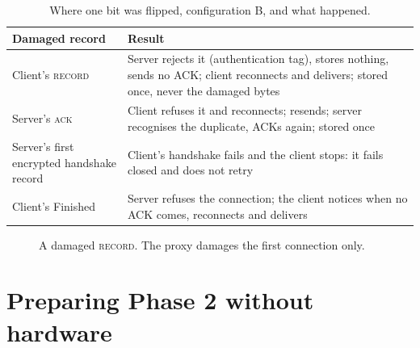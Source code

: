 \documentclass[11pt,a4paper]{article}
\newcommand{\msg}[1]{\textsc{#1}}
\begin{document}
\begin{table}[!htbp]
\centering
\caption{Where one bit was flipped, configuration B, and what happened.}
\label{tab:tamper}
\small
\begin{tabularx}{\linewidth}{@{}lX@{}}
\toprule
Damaged record & Result \\
\midrule
Client's \msg{record} & Server rejects it (authentication tag), stores nothing, sends no ACK; client reconnects and delivers; stored once, never the damaged bytes \\
Server's \msg{ack} & Client refuses it and reconnects; resends; server recognises the duplicate, ACKs again; stored once \\
Server's first encrypted handshake record & Client's handshake fails and the client stops: it fails closed and does not retry \\
Client's Finished & Server refuses the connection; the client notices when no ACK comes, reconnects and delivers \\
\bottomrule
\end{tabularx}
\end{table}

\begin{figure}[!tbp]
\centering
{}
\caption{A damaged \msg{record}. The proxy damages the first connection only.}
\label{fig:tamper}
\end{figure}

\section{Preparing Phase 2 without hardware}
\end{document}
